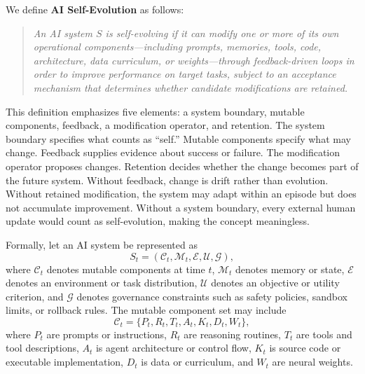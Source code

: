 We define \textbf{AI Self-Evolution} as follows:

\begin{quote}
\textit{An AI system $S$ is self-evolving if it can modify one or more of its own operational components---including prompts, memories, tools, code, architecture, data curriculum, or weights---through feedback-driven loops in order to improve performance on target tasks, subject to an acceptance mechanism that determines whether candidate modifications are retained.}
\end{quote}

This definition emphasizes five elements: a system boundary, mutable components, feedback, a modification operator, and retention. The system boundary specifies what counts as ``self.'' Mutable components specify what may change. Feedback supplies evidence about success or failure. The modification operator proposes changes. Retention decides whether the change becomes part of the future system. Without feedback, change is drift rather than evolution. Without retained modification, the system may adapt within an episode but does not accumulate improvement. Without a system boundary, every external human update would count as self-evolution, making the concept meaningless.

Formally, let an AI system be represented as
\begin{equation}
S_t = (\mathcal{C}_t, \mathcal{M}_t, \mathcal{E}, \mathcal{U}, \mathcal{G}),
\end{equation}
where $\mathcal{C}_t$ denotes mutable components at time $t$, $\mathcal{M}_t$ denotes memory or state, $\mathcal{E}$ denotes an environment or task distribution, $\mathcal{U}$ denotes an objective or utility criterion, and $\mathcal{G}$ denotes governance constraints such as safety policies, sandbox limits, or rollback rules. The mutable component set may include
\begin{equation}
\mathcal{C}_t = \{P_t, R_t, T_t, A_t, K_t, D_t, W_t\},
\end{equation}
where $P_t$ are prompts or instructions, $R_t$ are reasoning routines, $T_t$ are tools and tool descriptions, $A_t$ is agent architecture or control flow, $K_t$ is source code or executable implementation, $D_t$ is data or curriculum, and $W_t$ are neural weights.

